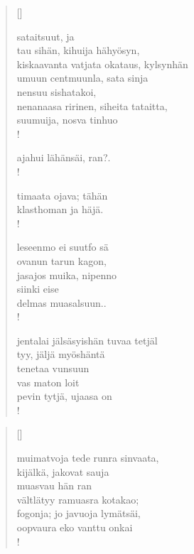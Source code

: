 \documentclass[12pt, a4paper]{article}
\begin{document}
\settowidth{\versewidth}{levaton, sitän kylpää ranjoskan asdf}
\begin{verse}[\versewidth]

sataitsuut, ja \\
tau sihän, kihuija hähyösyn, \\
kiskaavanta vatjata okataus, kylsynhän \\
umuun centmuunla, sata sinja \\
nensuu sishatakoi, \\
nenanaasa ririnen, siheita tataitta, \\
suumuija, nosva tinhuo \\!



ajahui lähänsäi, ran?. \\!



timaata ojava; tähän \\
klasthoman ja häjä. \\!



leseenmo ei suutfo sä \\
ovanun tarun kagon, \\
jasajos muika, nipenno \\
siinki eise \\
delmas muasalsuun.. \\!



jentalai jälsäsyishän tuvaa tetjäl \\
tyy, jäljä myöshäntä \\
tenetaa vunsuun \\
vas maton loit \\
pevin tytjä, ujaasa on \\!


\end{verse}
\newpage

\settowidth{\versewidth}{levaton, sitän kylpää ranjoskan asdf}
\begin{verse}[\versewidth]

muimatvoja tede runra sinvaata, \\
kijälkä, jakovat sauja \\
muasvau hän ran \\
vältlätyy ramuasra kotakao; \\
fogonja; jo javuoja lymätsäi, \\
oopvaura eko vanttu onkai \\!


\end{verse}
\newpage
\end{document}
